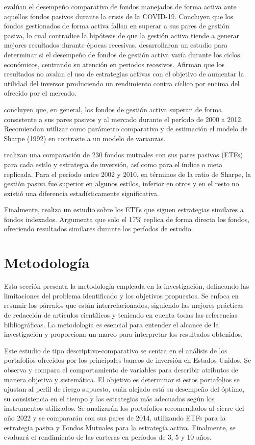 \documentclass[a4paper,fleqn]{cas-sc}
\begin{document}
\cite{Pastor} evalúan el desempeño comparativo de fondos manejados de forma activa ante aquellos fondos pasivos durante la crisis de la COVID-19. Concluyen que los fondos gestionados de forma activa fallan en superar a sus pares de gestión pasiva, lo cual contradice la hipótesis de que la gestión activa tiende a generar mejores resultados durante épocas recesivas. \cite{Souza} desarrollaron un estudio para determinar si el desempeño de fondos de gestión activa varía durante los ciclos económicos, centrando su atención en periodos recesivos. Afirman que los resultados no avalan el uso de estrategias activas con el objetivo de aumentar la utilidad del inversor produciendo un rendimiento contra cíclico por encima del ofrecido por el mercado.

\cite{Gerakos} concluyen que, en general, los fondos de gestión activa superan de forma consistente a sus pares pasivos y al mercado durante el período de 2000 a 2012. Recomiendan utilizar como parámetro comparativo y de estimación el modelo de Sharpe (1992) en contraste a un modelo de varianzas.

\cite{Sharifzadeh} realizan una comparación de 230 fondos mutuales con sus pares pasivos (ETFs) para cada estilo y estrategia de inversión, así como para el índice o meta replicada. Para el período entre 2002 y 2010, en términos de la ratio de Sharpe, la gestión pasiva fue superior en algunos estilos, inferior en otros y en el resto no existió una diferencia estadísticamente significativa.

Finalmente, \cite{Svetina} realiza un estudio sobre los ETFs que siguen estrategias similares a fondos indexados. Argumenta que solo el 17\% replica de forma directa los fondos, ofreciendo resultados similares durante los períodos de estudio.

\section{Metodología}
Esta sección presenta la metodología empleada en la investigación, delineando las limitaciones del problema identificado y los objetivos propuestos. Se enfoca en resumir los párrafos que están interrelacionados, siguiendo las mejores prácticas de redacción de artículos científicos y teniendo en cuenta todas las referencias bibliográficas. La metodología es esencial para entender el alcance de la investigación y proporciona un marco para interpretar los resultados obtenidos.

Este estudio de tipo descriptivo-comparativo se centra en el análisis de los portafolios ofrecidos por los principales bancos de inversión en Estados Unidos. Se observa y compara el comportamiento de variables para describir atributos de manera objetiva y sistemática. El objetivo es determinar si estos portafolios se ajustan al perfil de riesgo supuesto, cuán alejado está su desempeño del óptimo, su consistencia en el tiempo y las estrategias más adecuadas según los instrumentos utilizados. Se analizarán los portafolios recomendados al cierre del año 2022 y se compararán con sus pares de 2014, utilizando ETFs para la estrategia pasiva y Fondos Mutuales para la estrategia activa. Finalmente, se evaluará el rendimiento de las carteras en períodos de 3, 5 y 10 años.
\end{document}
